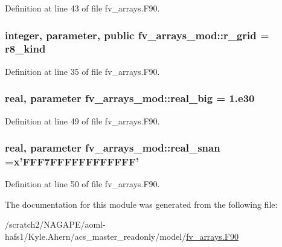 Definition at line 43 of file fv\-\_\-arrays.\-F90.

\subsubsection[{r\-\_\-grid}]{\setlength{\rightskip}{0pt plus 5cm}integer, parameter, public fv\-\_\-arrays\-\_\-mod\-::r\-\_\-grid = r8\-\_\-kind}\label{classfv__arrays__mod_ab0ba8527d270f349a84fa0a330be1923}


Definition at line 35 of file fv\-\_\-arrays.\-F90.

\subsubsection[{real\-\_\-big}]{\setlength{\rightskip}{0pt plus 5cm}real, parameter fv\-\_\-arrays\-\_\-mod\-::real\-\_\-big = 1.e30}\label{classfv__arrays__mod_aa61534ed3f1d97da89f9e2ff98a31279}


Definition at line 49 of file fv\-\_\-arrays.\-F90.

\subsubsection[{real\-\_\-snan}]{\setlength{\rightskip}{0pt plus 5cm}real, parameter fv\-\_\-arrays\-\_\-mod\-::real\-\_\-snan =x'F\-F\-F7\-F\-F\-F\-F\-F\-F\-F\-F\-F\-F\-F\-F'}\label{classfv__arrays__mod_ac263153323954d48a2ba22738897b14c}


Definition at line 50 of file fv\-\_\-arrays.\-F90.



The documentation for this module was generated from the following file\-:\begin{DoxyCompactItemize}
\item 
/scratch2/\-N\-A\-G\-A\-P\-E/aoml-\/hafs1/\-Kyle.\-Ahern/acs\-\_\-master\-\_\-readonly/model/\hyperlink{fv__arrays_8F90}{fv\-\_\-arrays.\-F90}\end{DoxyCompactItemize}
